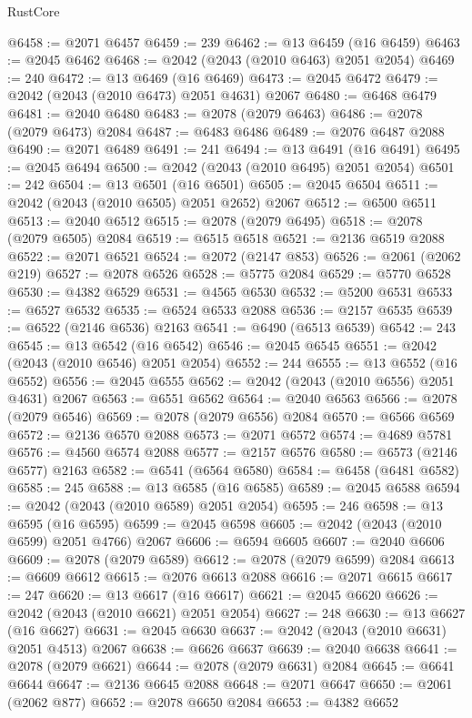 \begin{lexlean}{RustCore}
\begin{coremodule}
@6458 := @2071 @6457
@6459 := 239
@6462 := @13 @6459 (@16 @6459)
@6463 := @2045 @6462
@6468 := @2042 (@2043 (@2010 @6463) @2051 @2054)
@6469 := 240
@6472 := @13 @6469 (@16 @6469)
@6473 := @2045 @6472
@6479 := @2042 (@2043 (@2010 @6473) @2051 @4631) @2067
@6480 := @6468 @6479
@6481 := @2040 @6480
@6483 := @2078 (@2079 @6463)
@6486 := @2078 (@2079 @6473) @2084
@6487 := @6483 @6486
@6489 := @2076 @6487 @2088
@6490 := @2071 @6489
@6491 := 241
@6494 := @13 @6491 (@16 @6491)
@6495 := @2045 @6494
@6500 := @2042 (@2043 (@2010 @6495) @2051 @2054)
@6501 := 242
@6504 := @13 @6501 (@16 @6501)
@6505 := @2045 @6504
@6511 := @2042 (@2043 (@2010 @6505) @2051 @2652) @2067
@6512 := @6500 @6511
@6513 := @2040 @6512
@6515 := @2078 (@2079 @6495)
@6518 := @2078 (@2079 @6505) @2084
@6519 := @6515 @6518
@6521 := @2136 @6519 @2088
@6522 := @2071 @6521
@6524 := @2072 (@2147 @853)
@6526 := @2061 (@2062 @219)
@6527 := @2078 @6526
@6528 := @5775 @2084
@6529 := @5770 @6528
@6530 := @4382 @6529
@6531 := @4565 @6530
@6532 := @5200 @6531
@6533 := @6527 @6532
@6535 := @6524 @6533 @2088
@6536 := @2157 @6535
@6539 := @6522 (@2146 @6536) @2163
@6541 := @6490 (@6513 @6539)
@6542 := 243
@6545 := @13 @6542 (@16 @6542)
@6546 := @2045 @6545
@6551 := @2042 (@2043 (@2010 @6546) @2051 @2054)
@6552 := 244
@6555 := @13 @6552 (@16 @6552)
@6556 := @2045 @6555
@6562 := @2042 (@2043 (@2010 @6556) @2051 @4631) @2067
@6563 := @6551 @6562
@6564 := @2040 @6563
@6566 := @2078 (@2079 @6546)
@6569 := @2078 (@2079 @6556) @2084
@6570 := @6566 @6569
@6572 := @2136 @6570 @2088
@6573 := @2071 @6572
@6574 := @4689 @5781
@6576 := @4560 @6574 @2088
@6577 := @2157 @6576
@6580 := @6573 (@2146 @6577) @2163
@6582 := @6541 (@6564 @6580)
@6584 := @6458 (@6481 @6582)
@6585 := 245
@6588 := @13 @6585 (@16 @6585)
@6589 := @2045 @6588
@6594 := @2042 (@2043 (@2010 @6589) @2051 @2054)
@6595 := 246
@6598 := @13 @6595 (@16 @6595)
@6599 := @2045 @6598
@6605 := @2042 (@2043 (@2010 @6599) @2051 @4766) @2067
@6606 := @6594 @6605
@6607 := @2040 @6606
@6609 := @2078 (@2079 @6589)
@6612 := @2078 (@2079 @6599) @2084
@6613 := @6609 @6612
@6615 := @2076 @6613 @2088
@6616 := @2071 @6615
@6617 := 247
@6620 := @13 @6617 (@16 @6617)
@6621 := @2045 @6620
@6626 := @2042 (@2043 (@2010 @6621) @2051 @2054)
@6627 := 248
@6630 := @13 @6627 (@16 @6627)
@6631 := @2045 @6630
@6637 := @2042 (@2043 (@2010 @6631) @2051 @4513) @2067
@6638 := @6626 @6637
@6639 := @2040 @6638
@6641 := @2078 (@2079 @6621)
@6644 := @2078 (@2079 @6631) @2084
@6645 := @6641 @6644
@6647 := @2136 @6645 @2088
@6648 := @2071 @6647
@6650 := @2061 (@2062 @877)
@6652 := @2078 @6650 @2084
@6653 := @4382 @6652

\end{coremodule}
\end{lexlean}
